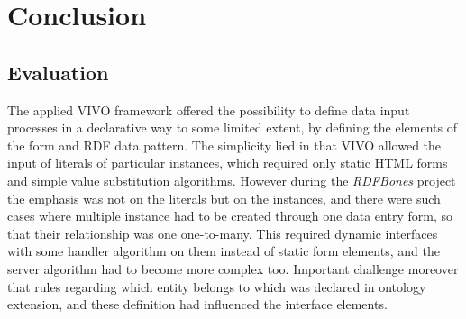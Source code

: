 

\chapter{Conclusion}

\section{Evaluation}

The applied VIVO framework offered the possibility to define data input processes in a declarative way to some limited extent, by defining the elements of the form and RDF data pattern. The simplicity lied in that VIVO allowed the input of literals of particular instances, which required only static HTML forms and simple value substitution algorithms. However during the \textit{RDFBones} project the emphasis was not on the literals but on the instances, and there were such cases where multiple instance had to be created through one data entry form, so that their relationship was one one-to-many. This required dynamic interfaces with some handler algorithm on them instead of static  form elements, and the server algorithm had to become more complex too. Important challenge moreover that rules regarding which entity belongs to which was declared in ontology extension, and these definition had influenced the interface elements.

